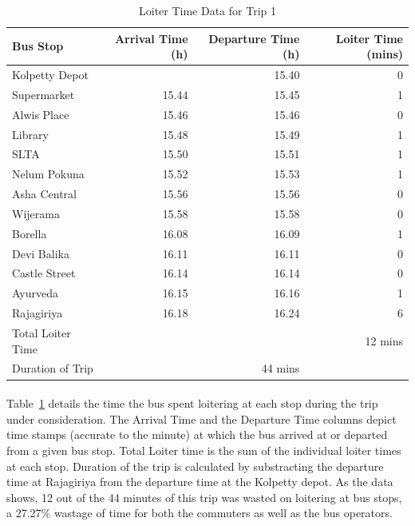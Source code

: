 \begin{table}[H]
\centering
\begin{tabular}{|l|r|r|r|}
\hline
Bus Stop & Arrival Time (h) & Departure Time (h) & Loiter Time (mins) \\
\hline
Kolpetty Depot	&	&15.40	&0\\
Supermarket	&15.44	&15.45	&1\\
Alwis Place	&15.46	&15.46	&0\\
Library	&15.48	&15.49	&1\\
SLTA	&15.50	&15.51	&1\\
Nelum Pokuna	&15.52	&15.53	&1\\
Asha Central	&15.56	&15.56	&0\\
Wijerama	&15.58	&15.58	&0\\
Borella	&16.08	&16.09	&1\\
Devi Balika	&16.11	&16.11	&0\\
Castle Street	&16.14	&16.14	&0\\
Ayurveda	&16.15	&16.16	&1\\
Rajagiriya	&16.18	&16.24	&6\\
\hline
Total Loiter Time & & & 12 mins \\
Duration of Trip & & 44 mins & \\
\hline
\end{tabular}
\caption{Loiter Time Data for Trip 1}
\label{table-trip1-LoiterTime}
\end{table}

\paragraph{} Table~\ref{table-trip1-LoiterTime} details the time the bus spent loitering at each stop during the trip under consideration. The Arrival Time and the Departure Time columns depict time stamps (accurate to the minute) at which the bus arrived at or departed from a given bus stop. Total Loiter time is the sum of the individual loiter times at each stop. Duration of the trip is calculated by substracting the departure time at Rajagiriya from the departure time at the Kolpetty depot. As the data shows, 12 out of the 44 minutes of this trip was wasted on loitering at bus stops, a 27.27\% wastage of time for both the commuters as well as the bus operators.

